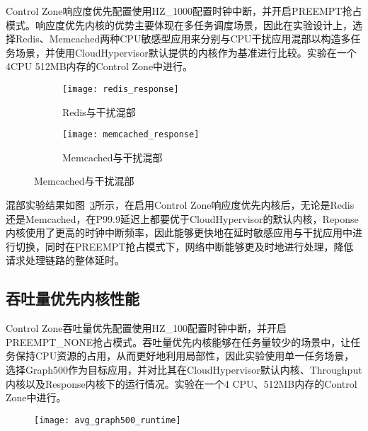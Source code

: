 Control Zone响应度优先配置使用HZ\_1000配置时钟中断，并开启PREEMPT抢占模式。响应度优先内核的优势主要体现在多任务调度场景，因此在实验设计上，选择Redis、Memcached两种CPU敏感型应用来分别与CPU干扰应用混部以构造多任务场景，并使用CloudHypervisor默认提供的内核作为基准进行比较。实验在一个4CPU 512MB内存的Control Zone中进行。

\begin{figure}[H]
    \centering
    \begin{subfigure}[b]{0.49\textwidth}
      \texttt{[image: redis\_response]}
      \caption{Redis与干扰混部}
      \label{fig:redis_response}
    \end{subfigure}
    \begin{subfigure}[b]{0.49\textwidth}
      \texttt{[image: memcached\_response]}
      \caption{Memcached与干扰混部}
      \label{fig:memcached_response}
    \end{subfigure}
    \label{fig:lc_response}
\end{figure}

混部实验结果如图~\ref{fig:lc_response}所示，在启用Control Zone响应度优先内核后，无论是Redis还是Memcached，在P99.9延迟上都要优于CloudHypervisor的默认内核，Reponse内核使用了更高的时钟中断频率，因此能够更快地在延时敏感应用与干扰应用中进行切换，同时在PREEMPT抢占模式下，网络中断能够更及时地进行处理，降低请求处理链路的整体延时。

\subsection{吞吐量优先内核性能}


Control Zone吞吐量优先配置使用HZ\_100配置时钟中断，并开启PREEMPT\_NONE抢占模式。吞吐量优先内核能够在任务量较少的场景中，让任务保持CPU资源的占用，从而更好地利用局部性，因此实验使用单一任务场景，选择Graph500作为目标应用，并对比其在CloudHypervisor默认内核、Throughput内核以及Response内核下的运行情况。实验在一个4 CPU、512MB内存的Control Zone中进行。

\begin{figure}[H]
    \centering
    \texttt{[image: avg\_graph500\_runtime]}
    \label{fig:avg_graph500_runtime}
\end{figure}

